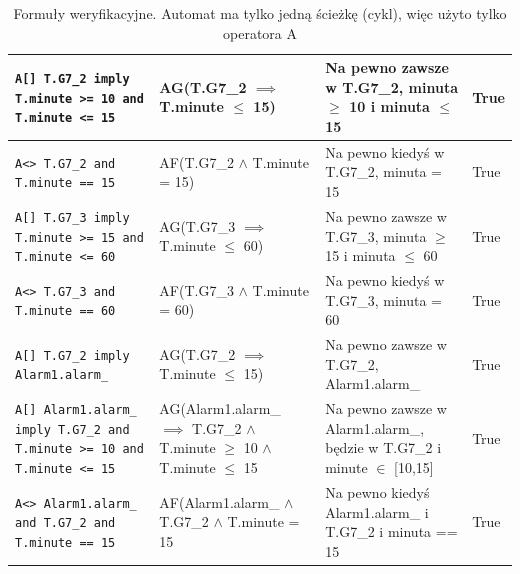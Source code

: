 \documentclass[12pt, a4paper]{article}
\begin{document}
\begin{landscape}
\begin{table}
\begin{tabularx}{\linewidth}{X|X|X|l}
            \texttt{A[] T.G7\_2 imply T.minute >= 10 and T.minute <= 15}                    & AG(T.G7\_2 $\implies$ T.minute $\le$ 15)                                                        & Na pewno zawsze w T.G7\_2, minuta $\ge$ 10 i minuta $\le$ 15              & True \\ \hline
            \texttt{A<> T.G7\_2 and T.minute == 15}                                         & AF(T.G7\_2 $ \wedge $ T.minute = 15)                                                            & Na pewno kiedyś w T.G7\_2, minuta = 15                                    & True \\ \hline
            \texttt{A[] T.G7\_3 imply T.minute >= 15 and T.minute <= 60}                    & AG(T.G7\_3 $\implies$ T.minute $\le$ 60)                                                        & Na pewno zawsze w T.G7\_3, minuta $\ge$ 15 i minuta $\le$ 60              & True \\ \hline
            \texttt{A<> T.G7\_3 and T.minute == 60}                                         & AF(T.G7\_3 $ \wedge $ T.minute = 60)                                                            & Na pewno kiedyś w T.G7\_3, minuta = 60                                    & True \\ \hline
            \texttt{A[] T.G7\_2 imply Alarm1.alarm\_}                                       & AG(T.G7\_2 $\implies$ T.minute $\le$ 15)                                                        & Na pewno zawsze w T.G7\_2, Alarm1.alarm\_                                 & True \\ \hline
            \texttt{A[] Alarm1.alarm\_ imply T.G7\_2 and T.minute >= 10 and T.minute <= 15} & AG(Alarm1.alarm\_ $\implies$ T.G7\_2 $ \wedge $ T.minute $\ge$ 10 $ \wedge $  T.minute $\le$ 15 & Na pewno zawsze w Alarm1.alarm\_, będzie w T.G7\_2 i minute $\in$ [10,15] & True \\ \hline
            \texttt{A<> Alarm1.alarm\_ and T.G7\_2 and T.minute == 15}                      & AF(Alarm1.alarm\_ $ \wedge $ T.G7\_2 $ \wedge $  T.minute = 15                                  & Na pewno kiedyś  Alarm1.alarm\_ i T.G7\_2 i minuta == 15                  & True \\
        \end{tabularx}
        \caption{Formuły weryfikacyjne. Automat ma tylko jedną ścieżkę (cykl), więc użyto tylko operatora A}
    \end{table}
\end{landscape}
\restoregeometry
\end{document}
